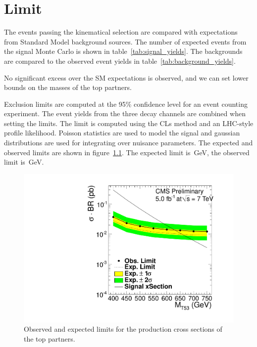 \chapter{Limit}
The events passing the kinematical selection are compared with expectations
from Standard Model background sources. The number of expected events from
the signal Monte Carlo is shown in table~\ref{tab:signal_yields}. The
backgrounds are compared to the observed event yields in
table~\ref{tab:background_yields}.


No significant excess over the SM expectations is observed, and we can set
lower bounds on the masses of the top partners.

Exclusion limits are computed at the 95\% confidence level for an event
counting experiment. The event yields from the three decay channels are
combined when setting the limits. The limit is computed using the CLs method
and an LHC-style profile likelihood. Poisson statistics are used to model
the signal and gaussian distributions are used for integrating over nuisance
parameters. The expected and observed limits are shown in
figure~\ref{fig:limit}.
The expected limit is~\unit[658]{GeV}, the observed limit
is~\unit[633]{GeV}.

\begin{figure}[htb]
    \centering
    \includegraphics[width=.9\textwidth]{images/pdf/oLimit_limit_macro_4jets_opt_btag_200_350_02}

    \caption{Observed and expected limits for the production cross sections
    of the top partners.}
    \label{fig:limit}
\end{figure}
